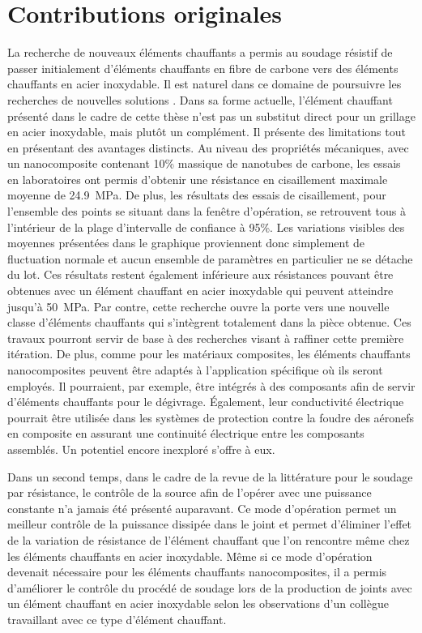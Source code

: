 \label{sec:Contributions}

\section{Contributions originales}

La recherche de nouveaux éléments chauffants a permis au soudage résistif de passer initialement d'éléments chauffants en fibre de carbone vers des éléments chauffants en acier inoxydable. 
Il est naturel dans ce domaine de poursuivre les recherches de nouvelles solutions \cite{Russello2019}. 
Dans sa forme actuelle, l'élément chauffant présenté dans le cadre de cette thèse n'est pas un substitut direct pour un grillage en acier inoxydable, mais plutôt un complément. 
Il présente des limitations tout en présentant des avantages distincts.
Au niveau des propriétés mécaniques, avec un nanocomposite contenant 10\% massique de nanotubes de carbone, les essais en laboratoires ont permis d'obtenir une résistance en cisaillement maximale moyenne de \SI{24.9}{\mega\pascal}. 
De plus, les résultats des essais de cisaillement, pour l'ensemble des points se situant dans la fenêtre d'opération, se retrouvent tous à l'intérieur de la plage d'intervalle de confiance à 95\%. 
Les variations visibles des moyennes présentées dans le graphique proviennent donc simplement de fluctuation normale et aucun ensemble de paramètres en particulier ne se détache du lot. 
Ces résultats restent également inférieure aux résistances pouvant être obtenues avec un élément chauffant en acier inoxydable qui peuvent atteindre jusqu'à \SI{50}{\mega\pascal}. 
Par contre, cette recherche ouvre la porte vers une nouvelle classe d'éléments chauffants qui s'intègrent totalement dans la pièce obtenue. 
Ces travaux pourront servir de base à des recherches visant à raffiner cette première itération. 
De plus, comme pour les matériaux composites, les éléments chauffants nanocomposites peuvent être adaptés à l'application spécifique où ils seront employés. 
Il pourraient, par exemple, être intégrés à des composants afin de servir d'éléments chauffants pour le dégivrage. 
Également, leur conductivité électrique pourrait être utilisée dans les systèmes de protection contre la foudre des aéronefs en composite en assurant une continuité électrique entre les composants assemblés. 
Un potentiel encore inexploré s'offre à eux. 

Dans un second temps, dans le cadre de la revue de la littérature pour le soudage par résistance, le contrôle de la source afin de l'opérer avec une puissance constante n'a jamais été présenté auparavant.  
Ce mode d'opération permet un meilleur contrôle de la puissance dissipée dans le joint et permet d'éliminer l'effet de la variation de résistance de l'élément chauffant que l'on rencontre même chez les éléments chauffants en acier inoxydable. 
Même si ce mode d'opération devenait nécessaire pour les éléments chauffants nanocomposites, il a permis d'améliorer le contrôle du procédé de soudage lors de la production de joints avec un élément chauffant en acier inoxydable selon les observations d'un collègue travaillant avec ce type d'élément chauffant. 

